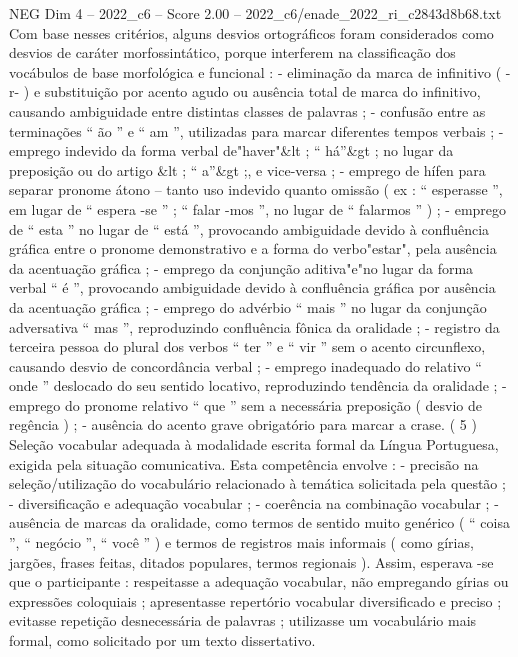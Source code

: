\begin{textsample}{NEG Dim 4 – 2022\_c6 – Score 2.00 – 2022\_c6/enade\_2022\_ri\_c2843d8b68.txt}
Com base nesses critérios, alguns desvios ortográficos foram considerados como desvios de caráter morfossintático, porque interferem na classificação dos vocábulos de base morfológica e funcional : - eliminação da marca de infinitivo ( -r- ) e substituição por acento agudo ou ausência total de marca do infinitivo, causando ambiguidade entre distintas classes de palavras ; - confusão entre as terminações “ ão ” e “ am ”, utilizadas para marcar diferentes tempos verbais ; - emprego indevido da forma verbal de"haver"\&lt ; “ há”\&gt ; no lugar da preposição ou do artigo \&lt ; “ a”\&gt ;, e vice-versa ; - emprego de hífen para separar pronome átono – tanto uso indevido quanto omissão ( ex : “ esperasse ”, em lugar de “ espera -se ” ; “ falar -mos ”, no lugar de “ falarmos ” ) ; - emprego de “ esta ” no lugar de “ está ”, provocando ambiguidade devido à confluência gráfica entre o pronome demonstrativo e a forma do verbo"estar", pela ausência da acentuação gráfica ; - emprego da conjunção aditiva"e"no lugar da forma verbal “ é ”, provocando ambiguidade devido à confluência gráfica por ausência da acentuação gráfica ; - emprego do advérbio “ mais ” no lugar da conjunção adversativa “ mas ”, reproduzindo confluência fônica da oralidade ; - registro da terceira pessoa do plural dos verbos “ ter ” e “ vir ” sem o acento circunflexo, causando desvio de concordância verbal ; - emprego inadequado do relativo “ onde ” deslocado do seu sentido locativo, reproduzindo tendência da oralidade ; - emprego do pronome relativo “ que ” sem a necessária preposição ( desvio de regência ) ; - ausência do acento grave obrigatório para marcar a crase. ( 5 ) Seleção vocabular adequada à modalidade escrita formal da Língua Portuguesa, exigida pela situação comunicativa.
Esta competência envolve : - precisão na seleção/utilização do vocabulário relacionado à temática solicitada pela questão ; - diversificação e adequação vocabular ; - coerência na combinação vocabular ; - ausência de marcas da oralidade, como termos de sentido muito genérico ( “ coisa ”, “ negócio ”, “ você ” ) e termos de registros mais informais ( como gírias, jargões, frases feitas, ditados populares, termos regionais ).
Assim, esperava -se que o participante : respeitasse a adequação vocabular, não empregando gírias ou expressões coloquiais ; apresentasse repertório vocabular diversificado e preciso ; evitasse repetição desnecessária de palavras ; utilizasse um vocabulário mais formal, como solicitado por um texto dissertativo.

\end{textsample}
